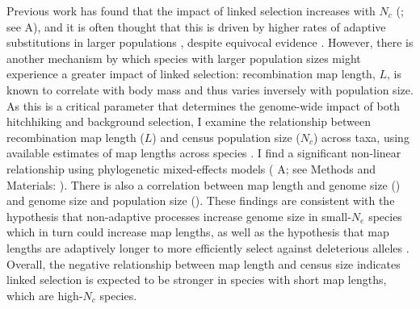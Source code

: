\documentclass[9pt,lineno]{elife}
\begin{document}
Previous work has found that the impact of linked selection increases with
$N_c$ (\cite{Corbett-Detig2015-gt}; see A), and it
is often thought that this is driven by higher rates of adaptive substitutions
in larger populations \citep{Ohta1992-yi}, despite equivocal evidence
\citep{Galtier2016-dq}.  However, there is another mechanism by which species
with larger population sizes might experience a greater impact of linked
selection: recombination map length, $L$, is known to correlate with body mass
\citep{Burt1987-tq} and thus varies inversely with population size. As this is
a critical parameter that determines the genome-wide impact of both hitchhiking
and background selection, I examine the relationship between recombination map
length ($L$) and census population size ($N_c$) across taxa, using available
estimates of map lengths across species
\citep{Stapley2017-fs,Corbett-Detig2015-gt}. I find a significant non-linear
relationship using phylogenetic mixed-effects models ( A; see
Methods and Materials: ).  There is also a correlation
between map length and genome size () and
genome size and population size (). These
findings are consistent with the hypothesis that non-adaptive processes
increase genome size in small-$N_e$ species \citep{Lynch2003-bn} which in turn
could increase map lengths, as well as the hypothesis that map lengths are
adaptively longer to more efficiently select against deleterious alleles
\citep{Roze2021-ya}.  Overall, the negative relationship between map length and
census size indicates linked selection is expected to be stronger in species
with short map lengths, which are high-$N_c$ species.
\end{document}

